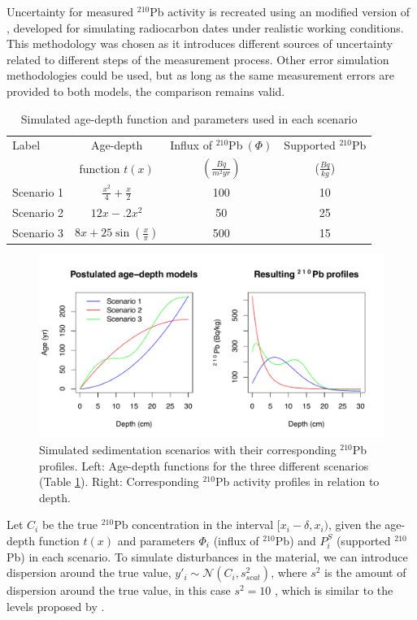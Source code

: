 \documentclass [10pt] {article}
\begin{document}
Uncertainty for measured $^{210}$Pb  activity is recreated using an modified version of \citet{Blaauw2018}, developed for simulating radiocarbon dates under realistic working conditions.
This methodology was chosen as it introduces different sources of uncertainty related to different steps of the measurement process.
Other error simulation methodologies could be used, but as long as the same measurement errors are provided to both models, the comparison remains valid.

\begin{table}[!h]
	\centering
	\begin{tabular}{l|ccc}
	     Label   & 	Age-depth			&	Influx of $^{210}$Pb$~(\Phi)$	& Supported $^{210}$Pb  \\
			&	function $t(x)$		&	$(\frac{Bq}{m^2yr})$	& ($\frac{Bq}{kg}$) 	\\ \hline
Scenario 1 	&	$\frac{x^2}{4} + \frac{x}{2}$	&	100	& 10	\\
Scenario 2 	&	$12x -.2x^2$			&	50	& 25	\\
Scenario 3 	&	$8x+25\sin(\frac{x}{\pi})$	&	500 	& 15		
	\end{tabular}
	\label{tab:sim_param}
	\caption{Simulated age-depth function and parameters used in each scenario}
\end{table}

\begin{figure}[!h]
 \centering
  \includegraphics[width=.95\linewidth]{chronology.pdf}
	\caption{Simulated sedimentation scenarios with their corresponding $^{210}$Pb profiles. Left: Age-depth functions for the three different scenarios (Table \ref{tab:sim_param}). Right: Corresponding $^{210}$Pb activity profiles in relation to depth.}
  \label{fig:true_210}
\end{figure}

	Let $C_{i}$ be the true $^{210}$Pb concentration in the interval $[ x_i-\delta, x_i)$, given the age-depth function $t(x)$ and parameters $\Phi_i$ (influx of $^{210}$Pb) and $P_i^S$ (supported $^{210}$Pb) in each scenario. 
To simulate disturbances in the material, we can introduce dispersion around the true value, $y'_i \sim \mathcal{N}\left(C_i,s^2_{scat} \right)$, where $s^2$ is the amount of dispersion around the true value, in this case $s^2=10$ , which is similar to the levels proposed by \citet{Blaauw2018}. 
\end{document}
